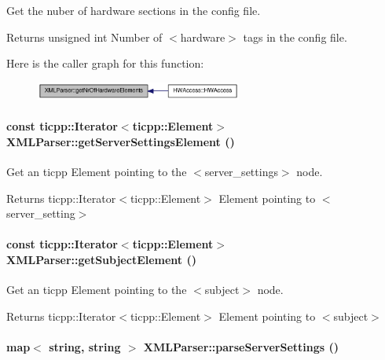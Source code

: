 Get the nuber of hardware sections in the config file. \begin{DoxyReturn}{Returns}
unsigned int Number of $<$hardware$>$ tags in the config file. 
\end{DoxyReturn}


Here is the caller graph for this function:\nopagebreak
\begin{figure}[H]
\begin{center}
\leavevmode
\includegraphics[width=192pt]{class_x_m_l_parser_ae07c6d8e846b82d5a3e0dbbe97cba58b_icgraph}
\end{center}
\end{figure}
\hypertarget{class_x_m_l_parser_a45d67d3b0da7ae2708ae3a003db30f05}{
\paragraph[{getServerSettingsElement}]{\setlength{\rightskip}{0pt plus 5cm}const ticpp::Iterator$<$ticpp::Element$>$ XMLParser::getServerSettingsElement ()}\hfill}
\label{class_x_m_l_parser_a45d67d3b0da7ae2708ae3a003db30f05}


Get an ticpp Element pointing to the $<$server\_\-settings$>$ node. \begin{DoxyReturn}{Returns}
ticpp::Iterator$<$ticpp::Element$>$ Element pointing to $<$server\_\-setting$>$ 
\end{DoxyReturn}
\hypertarget{class_x_m_l_parser_ae6dc7710411e5ae25e741cd7bb47b5f7}{
\paragraph[{getSubjectElement}]{\setlength{\rightskip}{0pt plus 5cm}const ticpp::Iterator$<$ticpp::Element$>$ XMLParser::getSubjectElement ()}\hfill}
\label{class_x_m_l_parser_ae6dc7710411e5ae25e741cd7bb47b5f7}


Get an ticpp Element pointing to the $<$subject$>$ node. \begin{DoxyReturn}{Returns}
ticpp::Iterator$<$ticpp::Element$>$ Element pointing to $<$subject$>$ 
\end{DoxyReturn}
\hypertarget{class_x_m_l_parser_acfd864a8c8cdbef4dcfa3516de24e752}{
\paragraph[{parseServerSettings}]{\setlength{\rightskip}{0pt plus 5cm}map$<$ string, string $>$ XMLParser::parseServerSettings ()}\hfill}
\label{class_x_m_l_parser_acfd864a8c8cdbef4dcfa3516de24e752}


